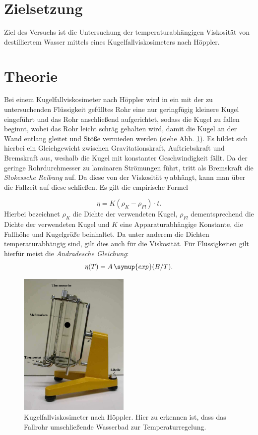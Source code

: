 \section{Zielsetzung}
\label{sec:Ziel}
Ziel des Versuchs ist die Untersuchung der temperaturabhängigen Viskosität von destilliertem Wasser mittels eines Kugelfallviskosimeters nach Höppler.


\section{Theorie}
\label{sec:Theorie}
Bei einem Kugelfallviskosimeter nach Höppler wird in ein mit der zu
untersuchenden Flüssigkeit gefülltes Rohr eine nur geringfügig kleinere
Kugel eingeführt und das Rohr anschließend aufgerichtet, sodass die Kugel
zu fallen beginnt, wobei das Rohr leicht schräg gehalten wird, damit die Kugel
an der Wand entlang gleitet und Stöße vermieden werden
(siehe Abb. \ref{fig:Viskosimeter}). Es bildet sich hierbei ein Gleichgewicht
zwischen Gravitationskraft, Auftriebskraft und Bremskraft aus, weshalb die Kugel
 mit konstanter Geschwindigkeit fällt. Da der geringe Rohrdurchmesser zu
 laminaren Strömungen führt, tritt als Bremskraft die \textit{Stokessche Reibung}
 auf. Da diese von der Viskosität $\eta$ abhängt, kann man über die Fallzeit auf
 diese schließen.
Es gilt die empirische Formel

\begin{equation}
  \eta = K \left(\rho_K - \rho_{Fl}\right) \cdot t.
  \label{eqn:eta}
\end{equation}
Hierbei bezeichnet $\rho_K$ die Dichte der verwendeten Kugel, $\rho_{Fl}$
dementsprechend die Dichte der verwendeten Kugel und $K$ eine Apparaturabhängige
Konstante, die Fallhöhe und Kugelgröße beinhaltet. Da unter anderem die Dichten
temperaturabhängig sind, gilt dies auch für die Viskosität.
Für Flüssigkeiten gilt hierfür meist die \textit{Andradesche Gleichung}:
\begin{equation}
  \eta(T) = A \, \symup{exp}(B/T).
  \label{eqn:eta(T)}
\end{equation}

\begin{figure}
  \centering
  \includegraphics[height=7cm]{./logos/Viskosimeter.PNG}
  \caption{Kugelfallviskosimeter nach Höppler. Hier zu erkennen ist, dass das Fallrohr umschließende Wasserbad zur Temperaturregelung. \cite{Anleitung}}
  \label{fig:Viskosimeter}
\end{figure}
